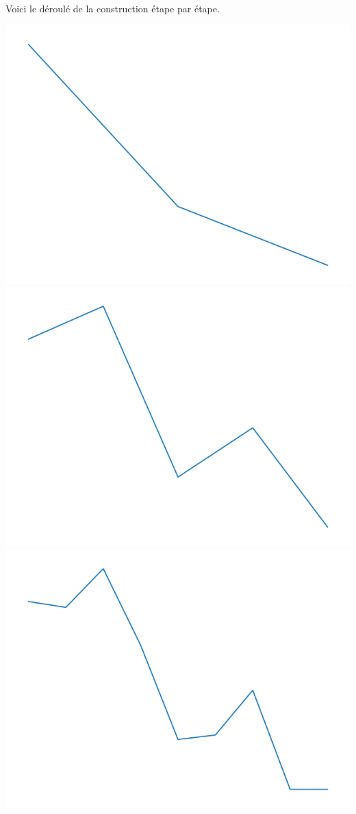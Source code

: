 \documentclass[11pt,class=report,crop=false]{standalone}
\begin{document}
\begin{exemple}
Voici le déroulé de la construction étape par étape.


\begin{center}
\includegraphics[scale=\myscale,scale=0.2]{figures/landscape-03-1}
\includegraphics[scale=\myscale,scale=0.2]{figures/landscape-03-2}
\includegraphics[scale=\myscale,scale=0.2]{figures/landscape-03-3}

\end{center}
\end{exemple}
\end{document}
